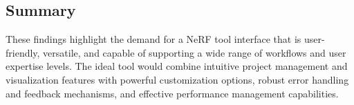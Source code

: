 \subsection*{Summary}

These findings highlight the demand for a NeRF tool interface that is user-friendly, versatile, and capable of supporting a wide range of workflows and user expertise levels. 
The ideal tool would combine intuitive project management and visualization features with powerful customization options, robust error handling and feedback mechanisms, and effective performance management capabilities.
